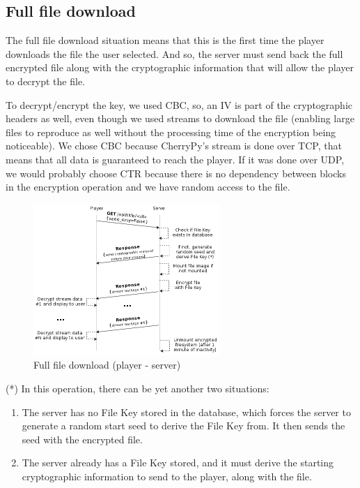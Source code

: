 \documentclass[11pt,a4paper]{report}
\begin{document}
\subsection{Full file download}
The full file download situation means that this is the first time the player downloads the file the user selected.
And so, the server must send back the full encrypted file along with the cryptographic information that will allow the player to decrypt the file.

To decrypt/encrypt the key, we used CBC, so, an IV is part of the cryptographic headers as well, even though we used streams to download the file (enabling large files to reproduce as well without the processing time of the encryption being noticeable).
We chose CBC because CherryPy's stream is done over TCP, that means that all data is guaranteed to reach the player. If it was done over UDP, we would probably choose CTR because there is no dependency between blocks in the encryption operation and we have random access to the file. 

\begin{figure}[H]
\centerline{\includegraphics[width=200pt]{images/fullFileDown.png}}
\caption{Full file download (player - server)}
\label{player}
\end{figure}

(*) In this operation, there can be yet another two situations:

\begin{enumerate}
  \item The server has no File Key stored in the database, which forces the server to generate a random start seed to derive the File Key from. It then sends the seed with the encrypted file.
  \item The server already has a File Key stored, and it must derive the starting cryptographic information to send to the player, along with the file.
\end{enumerate}
\end{document}
